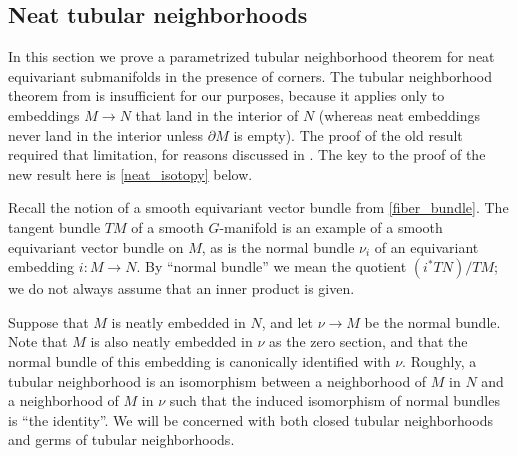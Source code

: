 \documentclass[11pt]{amsart}
\theoremstyle{definition}
\numberwithin{equation}{section}
\numberwithin{figure}{section}
\begin{document}
\subsection{Neat tubular neighborhoods}\label{tub}

In this section we prove a parametrized tubular neighborhood theorem for neat equivariant submanifolds in the presence of corners. 
The tubular neighborhood theorem from \cite[Thm 2.40]{GIMM1} is insufficient for our purposes, because it applies only to embeddings $M \to N$ that land in the interior of $N$ (whereas neat embeddings never land in the interior unless $\partial M$ is empty). The proof of the old result required that limitation, %
for reasons discussed in \cite[Rem 2.10]{GIMM1}. The key to the proof of the new result here is \autoref{neat_isotopy} below.

Recall the notion of a smooth equivariant vector bundle from \autoref{fiber_bundle}.
The tangent bundle $TM$ of a smooth $G$-manifold is an example of a smooth equivariant vector bundle on $M$, as is the normal bundle $\nu_i$ of an equivariant embedding $i\colon M\to N$. By ``normal bundle'' we mean the quotient $(i^\ast TN)/TM$; we do not always assume that an inner product is given.




Suppose that $M$ is neatly embedded in $N$, and let $\nu\to M$ be the normal bundle. Note that $M$ is also neatly embedded in $\nu$ as the zero section, and that the normal bundle of this embedding is canonically identified with $\nu$. Roughly, a tubular neighborhood is an isomorphism between a neighborhood of $M$ in $N$ and a neighborhood of $M$ in $\nu$ such that the induced isomorphism of normal bundles is ``the identity''. We will be concerned with both closed tubular neighborhoods and germs of tubular neighborhoods.
\end{document}
